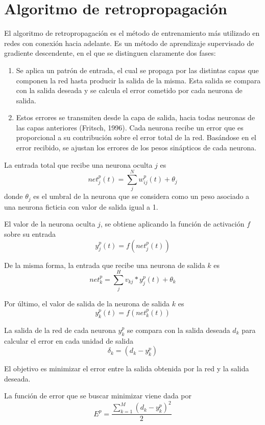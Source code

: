 \section{Algoritmo de retropropagación}
El algoritmo de retropropagación es el método de entrenamiento más utilizado en redes con conexión hacia adelante. Es un método de aprendizaje supervisado de gradiente descendente, en el que se distinguen claramente dos fases:
\begin{enumerate}
	\item Se aplica un patrón de entrada, el cual se propaga por las distintas capas que componen la red hasta producir la salida de la misma. Esta salida se compara con la salida deseada y se calcula el error cometido por cada neurona de salida.

	\item Estos errores se transmiten desde la capa de salida, hacia todas neuronas de las capas anteriores (Fritsch, 1996). Cada neurona recibe un error que es proporcional a su contribución sobre el error total de la red. Basándose en el error recibido, se ajustan los errores de los pesos sinápticos de cada neurona.
\end{enumerate}

La entrada total que recibe una neurona oculta $j$ es $$ net_{j}^{p}(t) = \sum_{j}^{N} w_{ij}^{p}(t) + \theta_{j} $$ donde $\theta_{j}$ es el umbral de la neurona que se considera como un peso asociado a una neurona ficticia con valor de salida igual a 1.

El valor de la neurona oculta $j$, se obtiene aplicando la función de activación $f$ sobre su entrada $$ y_{j}^{p}(t) = f(net_{j}^{p}(t)) $$

De la misma forma, la entrada que recibe una neurona de salida $k$ es $$ net_{k}^{p} = \sum_{j}^{H} v_{kj}*y_{j}^{p}(t) + \theta_{k} $$

Por último, el valor de salida de la neurona de salida $k$ es $$ y_{k}^{p}(t) = f(net_{k}^{p}(t)) $$

La salida de la red de cada neurona $y_{k}^{p}$ se compara con la salida deseada $d_{k}$ para calcular el error en cada unidad de salida $$ \delta_{k} = (d_{k} - y_{k}^{p}) $$

El objetivo es minimizar el error entre la salida obtenida por la red y la salida deseada.

La función de error que se buscar minimizar viene dada por $$ E^{p} = \frac{\sum_{k = 1}^{M}(d_{k} - y_{k}^{p})^{2}}{2} $$


